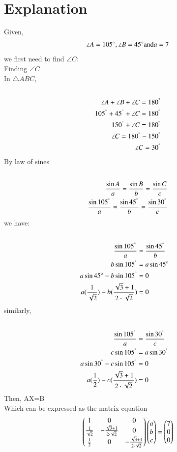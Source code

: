 \documentclass[journal,12pt,twocolumn]{IEEEtran}
\begin{document}
\section{Explanation}
Given,
\begin{align}
\angle A=105\degree,\angle B=45\degree \text{and}  a=7
\end{align}
we first need to find $\angle C$:
\\
Finding $\angle C$
\\
In $\triangle ABC$,
\begin{align}
\\
\angle A+\angle B+\angle C = 180^{\degree}
\\
105^{\degree}+45^{\degree}+\angle C = 180^{\degree}
\\
150^{\degree}+\angle C = 180^{\degree}
\\
\angle C = 180^{\degree}-150^{\degree}
\\
\angle C = 30^{\degree}
\\
\end{align}
By law of sines
\begin{align}
\\
\frac{\sin A}{a}=\frac{\sin B}{b}=\frac{\sin C}{c}
\\
\frac{\sin 105^{\degree}}{a}=\frac{\sin 45^{\degree}}{b}=\frac{\sin 30^{\degree}}{c}
\\
\end{align}
we have:
\begin{align}
\\
\frac{\sin 105^{\degree}}{a} &=\frac{\sin 45^{\degree}}{b}
\\
b\sin 105^{\degree} &=a\sin 45{\degree}
\\
a\sin 45{\degree}-b\sin 105^{\degree} &=0
\\
a(\frac{1}{\sqrt{2}})-b(\frac{\sqrt{3}+1}{2\cdot\sqrt{2}}) &=0
\\
\end{align}
similarly,
\begin{align}
\\
\frac{\sin 105^{\degree}}{a} &=\frac{\sin 30^{\degree}}{c}
\\
c\sin 105^{\degree} &=a\sin 30^{\degree}
\\
a\sin 30^{\degree}-c\sin 105^{\degree} &=0
\\
a(\frac{1}{2})-c(\frac{\sqrt{3}+1}{2\cdot\sqrt{2}}) &=0
\end{align}
Then, AX=B
\\
Which can be expressed as the matrix equation
\begin{align}
\label{eq:1}
\begin{pmatrix}1 & 0 & 0\\\frac{1}{\sqrt{2}} & -\frac{\sqrt{3}+1}{2\cdot\sqrt{2}} & 0\\\frac{1}{2} & 0 & -\frac{\sqrt{3}+1}{2\cdot\sqrt{2}}\end{pmatrix}\begin{pmatrix}a\\b\\c\end{pmatrix} = \begin{pmatrix}7\\0\\0\end{pmatrix}
\end{align}
\end{document}

